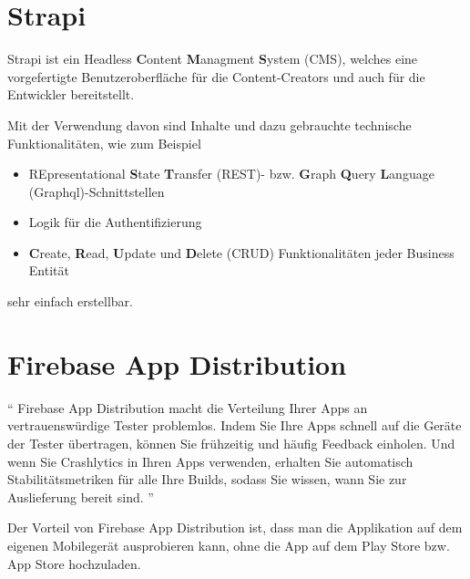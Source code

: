 
\section{Strapi}
Strapi ist ein Headless \textbf{C}ontent \textbf{M}anagment \textbf{S}ystem (CMS),
welches eine vorgefertigte Benutzeroberfläche für die Content-Creators
und auch für die Entwickler bereitstellt.

Mit der Verwendung davon sind  Inhalte und dazu gebrauchte technische Funktionalitäten, wie zum Beispiel

\begin{itemize}
    \item {RE}presentational \textbf{S}tate \textbf{T}ransfer (REST)- bzw. \textbf{G}raph \textbf{Q}uery \textbf{L}anguage (Graphql)-Schnittstellen
    \item Logik für die Authentifizierung
    \item \textbf{C}reate, \textbf{R}ead, \textbf{U}pdate und \textbf{D}elete (CRUD)
          Funktionalitäten jeder Business Entität
\end{itemize}

sehr einfach erstellbar.
\cite{strapi-vs-wordpress}


\section{Firebase App Distribution}

``
Firebase App Distribution macht die Verteilung
Ihrer Apps an vertrauenswürdige Tester problemlos. Indem Sie Ihre Apps schnell
auf die Geräte der Tester übertragen, können Sie frühzeitig und häufig
Feedback einholen.
Und wenn Sie Crashlytics in Ihren Apps verwenden, erhalten Sie automatisch Stabilitätsmetriken für alle Ihre Builds, sodass Sie wissen, wann Sie zur Auslieferung bereit sind.
''\cite{fire-base-app-distribution}

Der Vorteil von Firebase App Distribution ist,
dass man die Applikation auf dem eigenen Mobilegerät ausprobieren kann,
ohne die App auf dem Play Store bzw. App Store hochzuladen.
